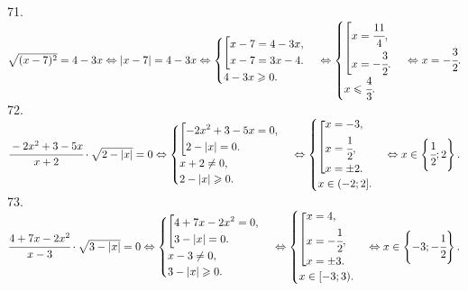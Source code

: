 \documentclass[12pt]{article}
\begin{document}
71. $\sqrt{(x-7)^2}=4-3x\Leftrightarrow|x-7|=4-3x\Leftrightarrow\begin{cases}\left[
      \begin{gathered} x-7=4-3x,\hfill\\
      x-7=3x-4.\hfill \end{gathered}\right.\\
4-3x\geqslant0.\end{cases}\Leftrightarrow\begin{cases}\left[
      \begin{gathered} x=\cfrac{11}{4},\hfill\\
      x=-\cfrac{3}{2}.\hfill \end{gathered}\right.\\
x\leqslant\cfrac{4}{3}.\end{cases}\Leftrightarrow x=-\cfrac{3}{2}.$\\
72. $\cfrac{-2x^2+3-5x}{x+2}\cdot\sqrt{2-|x|}=0\Leftrightarrow\begin{cases}\left[
      \begin{gathered} -2x^2+3-5x=0,\hfill\\
      2-|x|=0.\hfill \end{gathered}\right.\\
      x+2\neq0,\\
2-|x|\geqslant0.\end{cases}\Leftrightarrow\begin{cases}\left[
      \begin{gathered} x=-3,\hfill\\
      x=\cfrac{1}{2},\hfill\\
      x=\pm2.\hfill \end{gathered}\right.\\
      x\in(-2;2].\end{cases}\Leftrightarrow x\in \left \{\cfrac{1}{2};2\right\}.$\\
73. $\cfrac{4+7x-2x^2}{x-3}\cdot\sqrt{3-|x|}=0\Leftrightarrow\begin{cases}\left[
      \begin{gathered} 4+7x-2x^2=0,\hfill\\
      3-|x|=0.\hfill \end{gathered}\right.\\
      x-3\neq0,\\
3-|x|\geqslant0.\end{cases}\Leftrightarrow\begin{cases}\left[
      \begin{gathered} x=4  ,\hfill\\
      x=-\cfrac{1}{2},\hfill\\
      x=\pm3.\hfill \end{gathered}\right.\\
      x\in[-3;3).\end{cases}\Leftrightarrow x\in \left \{-3;-\cfrac{1}{2}\right\}.$\\
\end{document}
